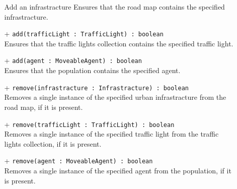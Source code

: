 \begin{itemize}
\begin{itemize}
    Add an infrastracture
    Ensures that the road map contains the specified infrastracture.
    \item[+] \texttt{add(trafficLight : TrafficLight) : boolean} \\
    Ensures that the traffic lights collection contains the specified traffic light.
    \item[+] \texttt{add(agent : MoveableAgent) : boolean} \\
    Ensures that the population contains the specified agent.
    \item[+] \texttt{remove(infrastracture : Infrastracture) : boolean} \\
    Removes a single instance of the specified urban infrastracture from the road map, if it is present.
    \item[+] \texttt{remove(trafficLight : TrafficLight) : boolean} \\
    Removes a single instance of the specified traffic light from the traffic lights collection, if it is present.
    \item[+] \texttt{remove(agent : MoveableAgent) : boolean} \\
    Removes a single instance of the specified agent from the population, if it is present.
  \end{itemize}
\end{itemize} 
